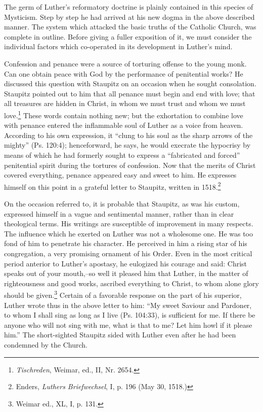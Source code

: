 The germ of Luther’s reformatory doctrine is plainly contained
in this species of Mysticism. Step by step he had arrived at his new
dogma in the above described manner. The system which attacked
the basic truths of the Catholic Church, was complete in outline.
Before giving a fuller exposition of it, we must consider the individual
factors which co-operated in its development in Luther’s mind.

Confession and penance were a source of torturing offense to the
young monk. Can one obtain peace with God by the performance
of penitential works? He discussed this question with Staupitz on an
occasion when he sought consolation. Staupitz pointed out to him that
all penance must begin and end with love; that all treasures are
hidden in Christ, in whom we must trust and whom we must love.\footnote
{\textit{Tischreden}, Weimar, ed., II, Nr. 2654.}
These words contain nothing new; but the exhortation to combine
love with penance entered the inflammable soul of Luther as a voice
from heaven. According to his own expression, it
“clung to his soul as the sharp arrows of the mighty” (Ps. 120:4);
henceforward, he says, he would execrate the hypocrisy by means of which he had
formerly sought to express a “fabricated and forced” penitential
spirit during the tortures of confession. Now that the merits
of Christ covered everything, penance appeared easy and sweet
to him. He expresses himself on this point in a grateful letter to
Staupitz, written in 1518.\footnote
{Enders, \textit{Luthers Briefwechsel}, I, p. 196 (May 30, 1518.)}

On the occasion referred to, it is probable that Staupitz, as was
his custom, expressed himself in a vague and sentimental manner,
rather than in clear theological terms. His writings are susceptible of
improvement in many respects. The influence which he exerted on
Luther was not a wholesome one. He was too fond of him to penetrate
his character. He perceived in him a rising star of his congregation,
a very promising ornament of his Order. Even in the most
critical period anterior to Luther’s apostasy, he eulogized his courage
and said: Christ speaks out of your mouth,--so well it pleased him
that Luther, in the matter of righteousness and good works, ascribed
everything to Christ, to whom alone glory should be given.\footnote{Weimar ed., XL, I, p. 131.}
Certain of a favorable response on the part of his superior, Luther wrote thus
in the above letter to him: “My sweet Saviour and Pardoner, to whom I
shall sing as long as I live (Ps. 104:33),
is sufficient for me. If there
be anyone who will not sing with me, what is that to me? Let him
howl if it please him.” The short-sighted Staupitz sided with Luther
even after he had been condemned by the Church.

